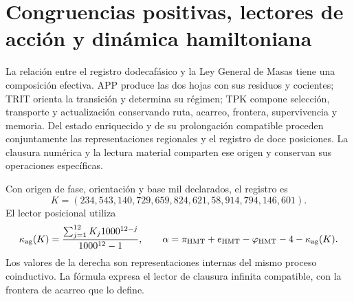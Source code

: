 
\section{Congruencias positivas, lectores de acción y dinámica hamiltoniana}
\label{sec:k-mass-bridge}

La relación entre el registro dodecafásico y la Ley General de Masas tiene
una composición efectiva. APP produce las dos hojas con sus residuos y
cocientes; TRIT orienta la transición y determina su régimen; TPK compone
selección, transporte y actualización conservando ruta, acarreo, frontera,
supervivencia y memoria. Del estado enriquecido y de su prolongación
compatible proceden conjuntamente las representaciones regionales y el
registro de doce posiciones. La clausura numérica y la lectura material
comparten ese origen y conservan sus operaciones específicas.

Con origen de fase, orientación y base mil declarados, el registro es
\[
 K=(234,543,140,729,659,824,621,58,914,794,146,601).
\]
El lector posicional utiliza
\begin{equation}
 \kappa_{\rm ag}(K)=\frac{\sum_{j=1}^{12}K_j1000^{12-j}}{1000^{12}-1},
 \qquad
 \alpha=\pi_{\rm HMT}+e_{\rm HMT}-\varphi_{\rm HMT}-4-
              \kappa_{\rm ag}(K).
 \label{eq:mass-k-alpha}
\end{equation}
Los valores de la derecha son representaciones internas del mismo proceso
coinductivo. La fórmula expresa el lector de clausura infinita compatible,
con la frontera de acarreo que lo define.

